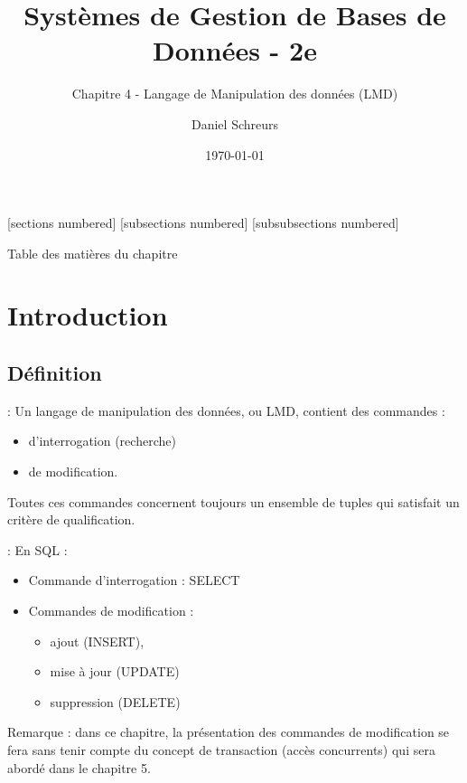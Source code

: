\documentclass[10pt]{beamer}
\title{Systèmes de Gestion de Bases de Données - 2e}
\subtitle{Chapitre 4 - Langage de Manipulation des données (LMD)}
\date{\today}
\author{Daniel Schreurs}
\institute{Haute École de Province de Liège}
\begin{document}
\maketitle

[sections numbered]
[subsections numbered]
[subsubsections numbered]
\begin{frame}[allowframebreaks]{Table des matières du chapitre}
    \tableofcontents[subsectionstyle=show/show/hide,subsubsectionstyle=show/show/hide,]
\end{frame}

\section{Introduction}
\tocss
\subsection{Définition}
\begin{frame}{\secname : \subsecname}
    Un langage de manipulation des données, ou LMD, contient des commandes :
    \begin{itemize}
        \item d'interrogation (recherche)
        \item de modification.
    \end{itemize}
    Toutes ces commandes concernent toujours un ensemble de tuples qui satisfait un critère de qualification.
\end{frame}

\begin{frame}{\secname : \subsecname}
    En SQL :
    \begin{itemize}
        \item Commande d'interrogation : SELECT
        \item Commandes de modification :
              \begin{itemize}
                  \item ajout (INSERT),
                  \item mise à jour (UPDATE)
                  \item suppression (DELETE)
              \end{itemize}
    \end{itemize}
    Remarque : dans ce chapitre, la présentation des commandes de modification se fera sans tenir compte du concept de transaction (accès concurrents) qui sera abordé dans le chapitre 5.
\end{frame}
\end{document}
